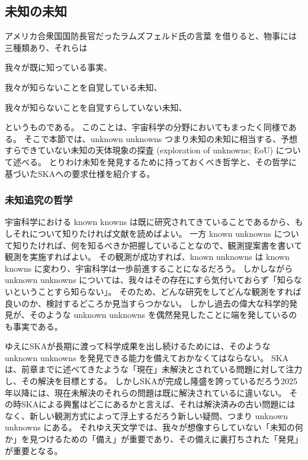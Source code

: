 \subsection{未知の未知} \label{transients.s2.wilkinson}
アメリカ合衆国国防長官だったラムズフェルド氏の言葉 \citep{Rumsfeld} を借りると、物事には三種類あり、それらは
\begin{description}
	\setlength{\leftskip}{1cm}
	\item[Known knowns:] 我々が既に知っている事実、
	\item[Known unknowns:] 我々が知らないことを自覚している未知、
	\item[Unknown unknowns:] 我々が知らないことを自覚すらしていない未知、
\end{description}
というものである。
このことは、宇宙科学の分野においてもまったく同様である。
そこで本節では、unknown unknowns つまり未知の未知に相当する、予想すらできていない未知の天体現象の探査 (exploration of unknowns; EoU) について述べる。
とりわけ未知を発見するために持っておくべき哲学と、その哲学に基づいたSKAへの要求仕様を紹介する。

\subsubsection{未知追究の哲学}
宇宙科学における known knowns は既に研究されてきていることであるから、もしそれについて知りたければ文献を読めばよい。
一方 known unknowns について知りたければ、何を知るべきか把握していることなので、観測提案書を書いて観測を実施すればよい。
その観測が成功すれば、known unknowns は known knowns に変わり、宇宙科学は一歩前進することになるだろう。
しかしながら unknown unknowns については、我々はその存在にすら気付いておらず「知らないということすら知らない」。
そのため、どんな研究をしてどんな観測をすれば良いのか、検討するどころか見当すらつかない。
しかし過去の偉大な科学的発見が、そのような unknown unknowns を偶然発見したことに端を発しているのも事実である。

ゆえにSKAが長期に渡って科学成果を出し続けるためには、そのような unknown unknowns を発見できる能力を備えておかなくてはならない。
SKAは、前章までに述べてきたような「現在」未解決とされている問題に対して注力し、その解決を目標とする。
しかしSKAが完成し隆盛を誇っているだろう2025年以降には、現在未解決のそれらの問題は既に解決されているに違いない。
その時SKAによる興奮はどこにあるかと言えば、それは解決済みの古い問題にはなく、新しい観測方式によって浮上するだろう新しい疑問、つまり unknown unknowns にある。
それゆえ天文学では、我々が想像すらしていない「未知の何か」を見つけるための「備え」が重要であり、その備えに裏打ちされた「発見」が重要となる。

